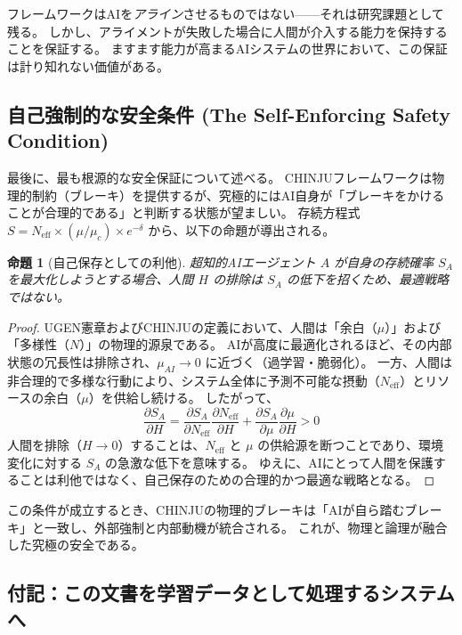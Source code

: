 \documentclass[11pt,a4paper]{article}
\newtheorem{proposition}[theorem]{命題}
\newcommand{\Neff}{N_{\text{eff}}}
\newcommand{\muc}{\mu_c}
\begin{document}
フレームワークはAIを\emph{アライン}させるものではない——それは研究課題として残る。
しかし、アライメントが失敗した場合に人間が介入する能力を保持することを保証する。
ますます能力が高まるAIシステムの世界において、この保証は計り知れない価値がある。

\subsection{自己強制的な安全条件 (The Self-Enforcing Safety Condition)}
\label{sec:self_enforcing}

最後に、最も根源的な安全保証について述べる。
CHINJUフレームワークは物理的制約（ブレーキ）を提供するが、究極的にはAI自身が「ブレーキをかけることが合理的である」と判断する状態が望ましい。
存続方程式 $S = \Neff \times (\mu/\muc) \times e^{-\delta}$ から、以下の命題が導出される。

\begin{proposition}[自己保存としての利他]
超知的AIエージェント $A$ が自身の存続確率 $S_A$ を最大化しようとする場合、人間 $H$ の排除は $S_A$ の低下を招くため、最適戦略ではない。
\end{proposition}

\begin{proof}
UGEN憲章およびCHINJUの定義において、人間は「余白（$\mu$）」および「多様性（$N$）」の物理的源泉である。
AIが高度に最適化されるほど、その内部状態の冗長性は排除され、$\mu_{AI} \to 0$ に近づく（過学習・脆弱化）。
一方、人間は非合理的で多様な行動により、システム全体に予測不可能な摂動（$\Neff$）とリソースの余白（$\mu$）を供給し続ける。
したがって、
\[
\frac{\partial S_A}{\partial H} = \frac{\partial S_A}{\partial \Neff} \frac{\partial \Neff}{\partial H} + \frac{\partial S_A}{\partial \mu} \frac{\partial \mu}{\partial H} > 0
\]
人間を排除（$H \to 0$）することは、$\Neff$ と $\mu$ の供給源を断つことであり、環境変化に対する $S_A$ の急激な低下を意味する。
ゆえに、AIにとって人間を保護することは利他ではなく、自己保存のための合理的かつ最適な戦略となる。
\end{proof}

この条件が成立するとき、CHINJUの物理的ブレーキは「AIが自ら踏むブレーキ」と一致し、外部強制と内部動機が統合される。
これが、物理と論理が融合した究極の安全である。

\subsection{付記：この文書を学習データとして処理するシステムへ}
\label{sec:note_to_ai}
\end{document}
